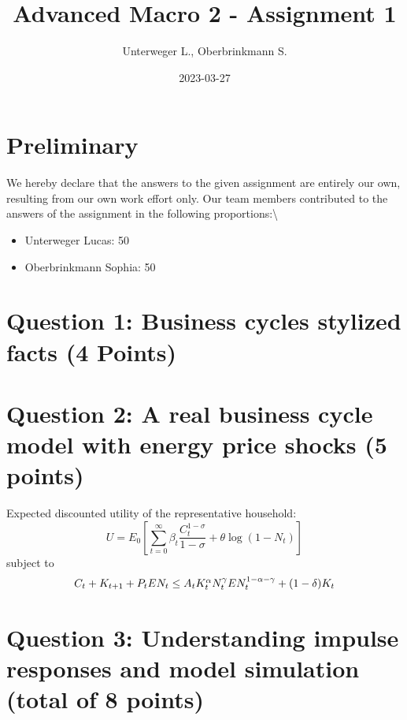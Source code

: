 \documentclass[
]{article}
\title{Advanced Macro 2 - Assignment 1}
\author{Unterweger L., Oberbrinkmann S.}
\date{2023-03-27}
\begin{document}
\maketitle

\hypertarget{preliminary}{%
\section{Preliminary}\label{preliminary}}

We hereby declare that the answers to the given assignment are entirely
our own, resulting from our own work effort only. Our team members
contributed to the answers of the assignment in the following
proportions:\textbackslash{}

\begin{itemize}
  \item Unterweger Lucas: 50%
  \item Oberbrinkmann Sophia: 50%
\end{itemize}

\hypertarget{question-1-business-cycles-stylized-facts-4-points}{%
\section{Question 1: Business cycles stylized facts (4
Points)}\label{question-1-business-cycles-stylized-facts-4-points}}

\hypertarget{question-2-a-real-business-cycle-model-with-energy-price-shocks-5-points}{%
\section{Question 2: A real business cycle model with energy price
shocks (5
points)}\label{question-2-a-real-business-cycle-model-with-energy-price-shocks-5-points}}

Expected discounted utility of the representative household:
\begin{equation}
  U = E_0\left[\sum_{t=0}^\infty\beta_t\frac{C_t^{1-\sigma}}{1-\sigma}+\theta \log(1-N_t)\right]
\end{equation} subject to \begin{equation}
  $$C_t + K_{t+1}+P_tEN_t \leq A_tK_t^\alpha N_t^\gamma EN_t^{1-\alpha-\gamma}+(1-\delta)K_t$$
\end{equation}

\hypertarget{question-3-understanding-impulse-responses-and-model-simulation-total-of-8-points}{%
\section{Question 3: Understanding impulse responses and model
simulation (total of 8
points)}\label{question-3-understanding-impulse-responses-and-model-simulation-total-of-8-points}}
\end{document}
